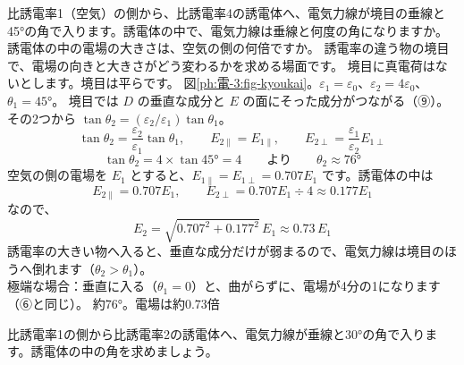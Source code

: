 \label{ph:電-3:ex8}
\begin{phreidai}[境目で曲がる電気力線]
比誘電率1（空気）の側から、比誘電率4の誘電体へ、電気力線が境目の垂線と45°の角で入ります。誘電体の中で、電気力線は垂線と何度の角になりますか。誘電体の中の電場の大きさは、空気の側の何倍ですか。
\phbamen
誘電率の違う物の境目で、電場の向きと大きさがどう変わるかを求める場面です。
\phmushi
境目に真電荷はないとします。境目は平らです。
\phzu
図\ref{ph:電-3:fig-kyoukai}。$\varepsilon_1=\varepsilon_0$、$\varepsilon_2=4\varepsilon_0$、$\theta_1=45°$。
\phriyu
境目では $D$ の垂直な成分と $E$ の面にそった成分がつながる（⑨）。その2つから $\tan\theta_2=(\varepsilon_2/\varepsilon_1)\tan\theta_1$。
\phtateru
\[\tan\theta_2=\frac{\varepsilon_2}{\varepsilon_1}\tan\theta_1,\qquad E_{2\parallel}=E_{1\parallel},\qquad E_{2\perp}=\frac{\varepsilon_1}{\varepsilon_2}E_{1\perp}\]
\phtoku
\[\tan\theta_2=4\times\tan45°=4\qquad\text{より}\qquad\theta_2\approx76°\]
空気の側の電場を $E_1$ とすると、$E_{1\parallel}=E_{1\perp}=0.707E_1$ です。誘電体の中は
\[E_{2\parallel}=0.707E_1,\qquad E_{2\perp}=0.707E_1\div4\approx0.177E_1\]
なので、
\[E_2=\sqrt{0.707^2+0.177^2}\,E_1\approx0.73\,E_1\]
\phtashikame
誘電率の大きい物へ入ると、垂直な成分だけが弱まるので、電気力線は境目のほうへ倒れます（$\theta_2>\theta_1$）。\\
極端な場合：垂直に入る（$\theta_1=0$）と、曲がらずに、電場が4分の1になります（⑥と同じ）。
\kotae 約76°。電場は約0.73倍
\end{phreidai}
\begin{jibun}
比誘電率1の側から比誘電率2の誘電体へ、電気力線が垂線と30°の角で入ります。誘電体の中の角を求めましょう。
\end{jibun}

